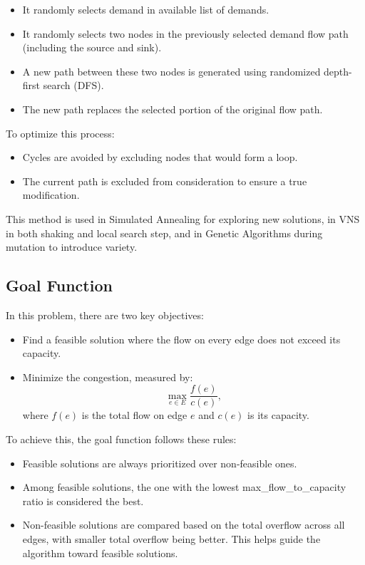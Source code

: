 \documentclass[a4paper,12pt]{article}
\begin{document}
\begin{itemize}
    \item It randomly selects demand in available list of demands.
    \item It randomly selects two nodes in the previously selected demand flow path (including the source and sink).
    \item A new path between these two nodes is generated using randomized depth-first search (DFS).
    \item The new path replaces the selected portion of the original flow path.
\end{itemize}

To optimize this process:
\begin{itemize}
    \item Cycles are avoided by excluding nodes that would form a loop.
    \item The current path is excluded from consideration to ensure a true modification.
\end{itemize}

\noindent This method is used in Simulated Annealing for exploring new solutions, in VNS in both shaking and local search step, and in Genetic Algorithms during mutation to introduce variety.

\subsection{Goal Function}

In this problem, there are two key objectives:
\begin{itemize}
    \item Find a feasible solution where the flow on every edge does not exceed its capacity.
    \item Minimize the congestion, measured by: 
    \[
    \max_{e \in E} \frac{f(e)}{c(e)},
    \]
    where \( f(e) \) is the total flow on edge \( e \) and \( c(e) \) is its capacity.
\end{itemize}

To achieve this, the goal function follows these rules:
\begin{itemize}
    \item Feasible solutions are always prioritized over non-feasible ones.
    \item Among feasible solutions, the one with the lowest max\_flow\_to\_capacity ratio is considered the best.
    \item Non-feasible solutions are compared based on the total overflow across all edges, with smaller total overflow being better. This helps guide the algorithm toward feasible solutions.
\end{itemize}
\end{document}
